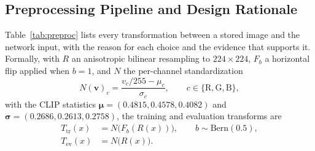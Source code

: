 \documentclass[10pt,journal]{IEEEtran}
\newcommand{\vect}[1]{\boldsymbol{#1}}
\begin{document}
\subsection{Preprocessing Pipeline and Design Rationale}\label{sec:preproc}
Table~\ref{tab:preproc} lists every transformation between a stored image and
the network input, with the reason for each choice and the evidence that
supports it. Formally, with $R$ an anisotropic bilinear resampling to
$224\times224$, $F_b$ a horizontal flip applied when $b=1$, and $N$ the
per-channel standardization
\begin{equation}
N(\vect{v})_c=\frac{v_c/255-\mu_c}{\sigma_c},\qquad c\in\{\mathrm{R},\mathrm{G},\mathrm{B}\},
\label{eq:norm}
\end{equation}
with the CLIP statistics $\vect{\mu}=(0.4815,0.4578,0.4082)$ and
$\vect{\sigma}=(0.2686,0.2613,0.2758)$, the training and evaluation transforms
are
\begin{align}
T_{\mathrm{tr}}(x)&=N\big(F_b(R(x))\big),\qquad b\sim\mathrm{Bern}(0.5),
\label{eq:transforms}\\
T_{\mathrm{ev}}(x)&=N\big(R(x)\big).
\end{align}
\end{document}
